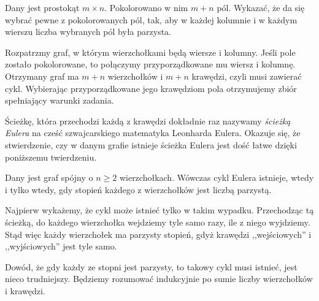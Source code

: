 \vspace{10px}



\noindent
Dany jest prostokąt $m \times n$. Pokolorowano w nim $m + n$ pól. Wykazać, że da się wybrać pewne z pokolorowanych pól, tak, aby w każdej kolumnie i w każdym wierszu liczba wybranych pól była parzysta.

\vspace{5px}


\noindent
Rozpatrzmy graf, w którym wierzchołkami będą wiersze i kolumny. Jeśli pole zostało pokolorowane, to połączymy przyporządkowane mu wiersz i kolumnę. Otrzymany graf ma $m + n$ wierzchołków i $m + n$ krawędzi, czyli musi zawierać cykl. Wybierając przyporządkowane jego krawędziom pola otrzymujemy zbiór spełniający warunki zadania.

\vspace{10px}

\noindent
Ścieżkę, która przechodzi każdą z krawędzi dokładnie raz nazywamy \textit{ścieżką Eulera} na cześć szwajcarskiego matematyka Leonharda Eulera. Okazuje się, że stwierdzenie, czy w danym grafie istnieje ścieżka Eulera jest dość łatwe dzięki poniższemu twierdzeniu.

\vspace{10px}


\noindent
Dany jest graf spójny o $n \geqslant 2$ wierzchołkach. Wówczas cykl Eulera istnieje, wtedy i tylko wtedy, gdy stopień każdego z wierzchołków jest liczbą parzystą.

\vspace{5px}


\noindent
Najpierw wykażemy, że cykl może istnieć tylko w takim wypadku. Przechodząc tą ścieżką, do każdego wierzchołka wejdziemy tyle samo razy, ile z niego wyjdziemy. Stąd więc każdy wierzchołek ma parzysty stopień, gdyż krawędzi ,,wejściowych'' i ,,wyjściowych'' jest tyle samo.

\vspace{10 px}

\noindent
Dowód, że gdy każdy ze stopni jest parzysty, to takowy cykl musi istnieć, jest nieco trudniejszy. Będziemy rozumować indukcyjnie po sumie liczby wierzchołków i krawędzi.

\vspace{5px}

